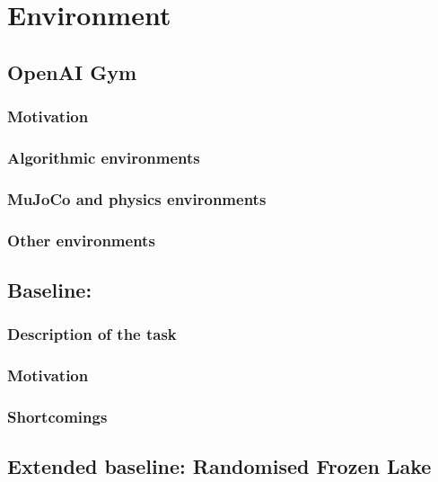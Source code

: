 
\chapter{Environment} %

\label{Chapter3} %


\section{OpenAI Gym}
\subsection{Motivation}
\subsection{Algorithmic environments}
\subsection{MuJoCo and physics environments}
\subsection{Other environments}


\section{Baseline: }
\subsection{Description of the task}
\subsection{Motivation}
\subsection{Shortcomings}

\section{Extended baseline: Randomised Frozen Lake}